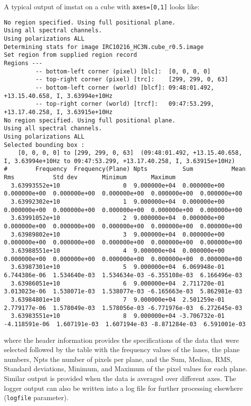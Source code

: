 A typical output of imstat on a cube with {\tt axes=[0,1]} looks
like:

\small
\begin{verbatim}
No region specified. Using full positional plane.
Using all spectral channels.
Using polarizations ALL
Determining stats for image IRC10216_HC3N.cube_r0.5.image
Set region from supplied region record
Regions --- 
         -- bottom-left corner (pixel) [blc]:  [0, 0, 0, 0]
         -- top-right corner (pixel) [trc]:    [299, 299, 0, 63]
         -- bottom-left corner (world) [blcf]: 09:48:01.492, +13.15.40.658, I, 3.63994e+10Hz
         -- top-right corner (world) [trcf]:   09:47:53.299, +13.17.40.258, I, 3.63915e+10Hz
No region specified. Using full positional plane.
Using all spectral channels.
Using polarizations ALL
Selected bounding box : 
    [0, 0, 0, 0] to [299, 299, 0, 63]  (09:48:01.492, +13.15.40.658, I, 3.63994e+10Hz to 09:47:53.299, +13.17.40.258, I, 3.63915e+10Hz)
#        Frequency  Frequency(Plane) Npts          Sum           Mean          Rms           Std dev       Minimum       Maximum     
  3.63993552e+10                  0  9.000000e+04  0.000000e+00  0.000000e+00  0.000000e+00  0.000000e+00  0.000000e+00  0.000000e+00
  3.63992302e+10                  1  9.000000e+04  0.000000e+00  0.000000e+00  0.000000e+00  0.000000e+00  0.000000e+00  0.000000e+00
  3.63991052e+10                  2  9.000000e+04  0.000000e+00  0.000000e+00  0.000000e+00  0.000000e+00  0.000000e+00  0.000000e+00
  3.63989802e+10                  3  9.000000e+04  0.000000e+00  0.000000e+00  0.000000e+00  0.000000e+00  0.000000e+00  0.000000e+00
  3.63988551e+10                  4  9.000000e+04  0.000000e+00  0.000000e+00  0.000000e+00  0.000000e+00  0.000000e+00  0.000000e+00
  3.63987301e+10                  5  9.000000e+04  6.069948e-01  6.744386e-06  1.534640e-03  1.534634e-03 -6.355108e-03  6.166496e-03
  3.63986051e+10                  6  9.000000e+04  2.711720e-01  3.013023e-06  1.538071e-03  1.538077e-03 -6.165663e-03  5.862981e-03
  3.63984801e+10                  7  9.000000e+04  2.501259e-01  2.779177e-06  1.578049e-03  1.578056e-03 -6.771976e-03  6.272645e-03
  3.63983551e+10                  8  9.000000e+04 -3.706732e-01 -4.118591e-06  1.607191e-03  1.607194e-03 -8.871284e-03  6.591001e-03
\end{verbatim}

where the header information provides the specifications of the data
that were selected followed by the table with the frequency values of
the lanes, the plane numbers,
Npts the number of pixels per plane, and the Sum, Median, RMS, Standard
deviations, Minimum, and Maximum of the pixel values for each
plane. Similar output is provided when the data is averaged over
different axes. The logger output can also be written into a log file
for further processing elsewhere ({\tt logfile} parameter). 


